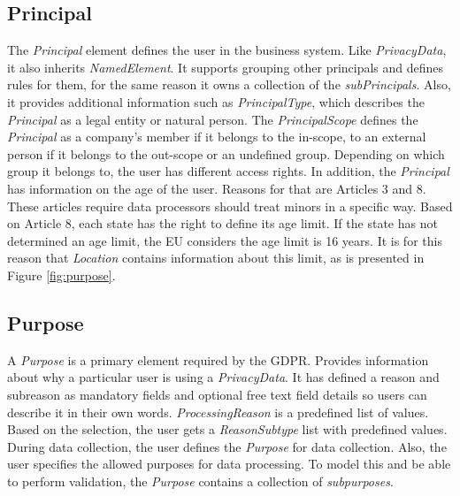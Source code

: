 \documentclass[11pt,english]{article}
\begin{document}
\subsection{Principal}
The \emph{Principal} element defines the user in the business system. Like \emph{PrivacyData}, it also inherits \emph{NamedElement}. It supports grouping other principals and defines rules for them, for the same reason it owns a collection of the \emph{subPrincipals}. Also, it provides additional information such as \emph{PrincipalType}, which describes the \emph{Principal} as a legal entity or natural person. The \emph{PrincipalScope} defines the \emph{Principal} as a company's member if it belongs to the in-scope, to an external person if it belongs to the out-scope or an undefined group. Depending on which group it belongs to, the user has different access rights. In addition, the \emph{Principal} has information on the age of the user. 
Reasons for that are Articles 3 and 8. These articles require 
data processors should treat minors in a specific way. Based on Article 8, each state has the right to define its age limit. If the state has not determined an age limit, the EU considers the age limit is 16 years. It is for this reason that \emph{Location} contains information about this limit, as is presented in Figure \ref{fig:purpose}.
\subsection{Purpose}
A \emph{Purpose} is a primary element required by the GDPR. Provides information about why a particular user is using a \emph{PrivacyData}. It has defined a reason and subreason as mandatory fields and optional free text field details so users can describe it in their own words. \emph{ProcessingReason} is a predefined list of values. Based on the selection, the user gets a \emph{ReasonSubtype} list with predefined values. During data collection, the user defines the \emph{Purpose} for data collection. Also, the user specifies the allowed purposes for data processing. To model this and be able to perform validation, the \emph{Purpose} contains a collection of \emph{subpurposes}. 
\end{document}

